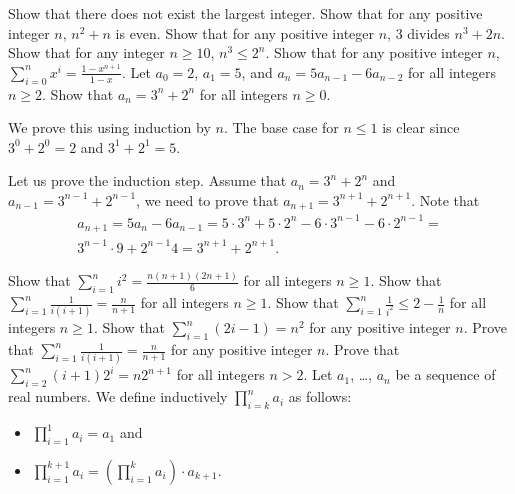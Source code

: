 \begin{chapterendexercises}
    \exercise Show that there does not exist the largest integer.
    \exercise[recommended] Show that for any positive integer $n$, $n^2 + n$ is even.
    \exercise Show that for any positive integer $n$, $3$ divides
        $n^3 + 2n$.
    \exercise Show that for any integer $n \ge 10$,
        $n^3 \le 2^n$.
    \exercise Show that for any positive integer $n$,
        $\sum_{i = 0}^n x^i = \frac{1 - x^{n + 1}}{1 - x}$.
    \exercise Let $a_0 = 2$, $a_1 = 5$, and $a_n = 5a_{n - 1} - 6 a_{n - 2}$
        for all integers $n \ge 2$. Show that $a_n = 3^n + 2^n$ for all integers
        $n \ge 0$.
        \begin{solution}
            We prove this using induction by $n$. The base case for $n \le 1$ is clear
            since $3^0 + 2^0 = 2$ and $3^1 + 2^1 = 5$.

            Let us prove the induction step. Assume that $a_n = 3^n + 2^n$ and
            $a_{n - 1} = 3^{n - 1} + 2^{n - 1}$, we need to prove that
            $a_{n + 1} = 3^{n + 1} + 2^{n + 1}$. Note that
            \begin{multline*}
                a_{n + 1} = 5a_n - 6 a_{n - 1} =
                5 \cdot 3^n + 5 \cdot 2^n - 6 \cdot 3^{n - 1} -
                6 \cdot 2^{n - 1} = \\
                3^{n - 1} \cdot 9 + 2^{n - 1} 4 = 3^{n + 1} + 2^{n + 1}.
            \end{multline*}
        \end{solution}
    \exercise[recommended] Show that $\sum_{i = 1}^n i^2 =
        \frac{n (n + 1)(2n + 1)}{6}$ for all integers $n \ge 1$.
    \exercise Show that $\sum_{i = 1}^n \frac{1}{i (i + 1)} =
        \frac{n}{n + 1}$ for all integers $n \ge 1$.
    \exercise Show that $\sum_{i = 1}^n \frac{1}{i^2} \le
        2 - \frac{1}{n}$ for all integers $n \ge 1$.
    \exercise Show that $\sum_{i = 1}^n (2i - 1) = n^2$ for any positive
        integer $n$.
    \exercise Prove that $\sum_{i = 1}^n \frac{1}{i (i + 1)} =
        \frac{n}{n + 1}$ for any positive integer $n$.
    \exercise Prove that $\sum_{i = 2}^n (i + 1) 2^i = n 2^{n + 1}$
        for all integers $n > 2$.
    \exercise Let $a_1$, \dots, $a_n$ be a sequence of real numbers.
        We define inductively
        $\prod_{i = k}^n a_i$ as follows:
        \begin{itemize}
            \item $\prod_{i = 1}^1 a_i = a_1$ and
            \item $\prod_{i = 1}^{k + 1} a_i =
                \left( \prod_{i = 1}^k a_i \right) \cdot a_{k + 1}$.
        \end{itemize}


\end{chapterendexercises}
